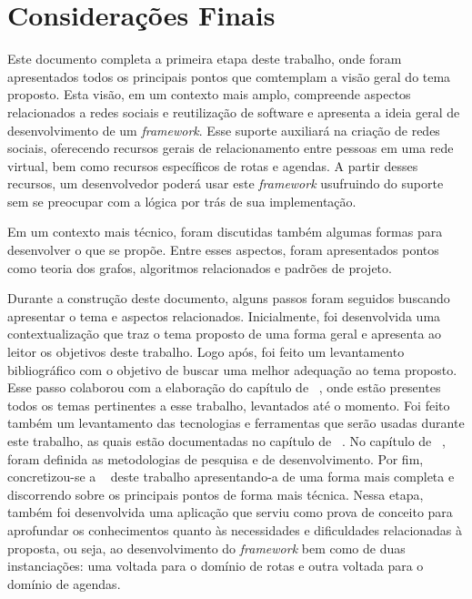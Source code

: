 \chapter{Considerações Finais}
\label{chapter:Consideracoes_Finais}

 Este documento completa a primeira etapa deste trabalho, onde foram apresentados todos os principais pontos que comtemplam a visão geral do tema proposto. Esta visão, em um contexto mais amplo, compreende aspectos relacionados a redes sociais e reutilização de software e apresenta a ideia geral de desenvolvimento de um \textit{framework}. Esse suporte auxiliará na criação de redes sociais, oferecendo recursos gerais de relacionamento entre pessoas em uma rede virtual, bem como recursos específicos de rotas e agendas. A partir desses recursos, um desenvolvedor poderá usar este \textit{framework} usufruindo do suporte sem se preocupar com a lógica por trás de sua implementação.

 Em um contexto mais técnico, foram discutidas também algumas formas para desenvolver o que se propõe. Entre esses aspectos, foram apresentados pontos como teoria dos grafos, algoritmos relacionados e padrões de projeto.

Durante a construção deste documento, alguns passos foram seguidos buscando apresentar o tema e aspectos relacionados. Inicialmente, foi desenvolvida uma contextualização que traz o tema proposto de uma forma geral e apresenta ao leitor os objetivos deste trabalho. Logo após, foi feito um levantamento bibliográfico com o objetivo de buscar uma melhor adequação ao tema proposto. Esse passo colaborou com a elaboração do capítulo de ~, onde estão presentes todos os temas pertinentes a esse trabalho, levantados até o momento. Foi feito também um levantamento das tecnologias e ferramentas que serão usadas durante este trabalho, as quais estão documentadas no capítulo de ~. No capítulo de ~, foram definida as metodologias de pesquisa e de desenvolvimento. Por fim, concretizou-se a ~ deste trabalho apresentando-a de uma forma mais completa e discorrendo sobre os principais pontos de forma mais técnica. Nessa etapa, também foi desenvolvida uma aplicação que serviu como prova de conceito para aprofundar os conhecimentos quanto às necessidades e dificuldades relacionadas à proposta, ou seja, ao desenvolvimento do \textit{framework} bem como de duas instanciações: uma voltada para o domínio de rotas e outra voltada para o domínio de agendas.

